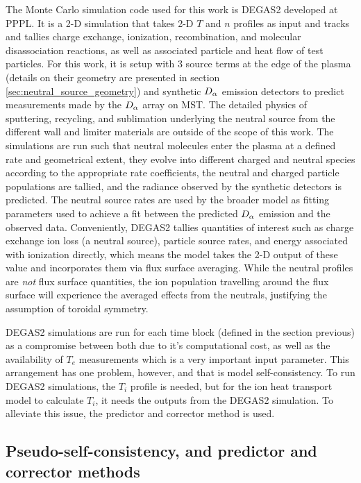 The Monte Carlo simulation code used for this work is DEGAS2 developed at PPPL\cite{Stotler}. It is a 2-D simulation that takes 2-D $T$ and $n$ profiles as input and tracks and tallies charge exchange, ionization, recombination, and molecular disassociation reactions, as well as associated particle and heat flow of test particles. For this work, it is setup with 3 source terms at the edge of the plasma (details on their geometry are presented in section \ref{sec:neutral_source_geometry}) and synthetic $D_{\alpha}$ emission detectors to predict measurements made by the $D_{\alpha}$ array on MST. The detailed physics of sputtering, recycling, and sublimation underlying the neutral source from the different wall and limiter materials are outside of the scope of this work. The simulations are run such that neutral molecules enter the plasma at a defined rate and geometrical extent, they evolve into different charged and neutral species according to the appropriate rate coefficients, the neutral and charged particle populations are tallied, and the radiance observed by the synthetic detectors is predicted. The neutral source rates are used by the broader model as fitting parameters used to achieve a fit between the predicted $D_{\alpha}$ emission and the observed data. Conveniently, DEGAS2 tallies quantities of interest such as charge exchange ion loss (a neutral source), particle source rates, and energy associated with ionization directly, which means the model takes the 2-D output of these value and incorporates them via flux surface averaging. While the neutral profiles are \textit{not} flux surface quantities, the ion population travelling around the flux surface will experience the averaged effects from the neutrals, justifying the  assumption of toroidal symmetry.

DEGAS2 simulations are run for each time block (defined in the section previous) as a compromise between both due to  it's computational cost, as well as the availability of $T_e$ measurements which is a very important input parameter. This arrangement has one problem, however, and that is model self-consistency. To run DEGAS2 simulations, the $T_i$ profile is needed, but for the ion heat transport model to calculate $T_i$, it needs the outputs from the DEGAS2 simulation. To alleviate this issue, the predictor and corrector method is used.

\subsection{Pseudo-self-consistency, and predictor and corrector methods}\label{sec:predictor_and_corrector}

